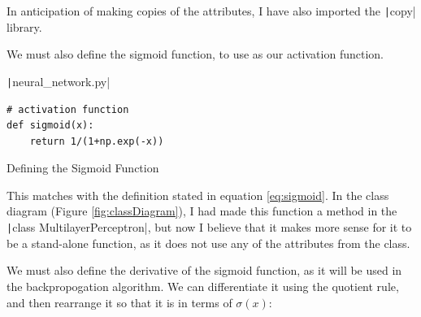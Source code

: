 \documentclass[12pt]{report}
\newcommand{\pil}[1]{\protect\texttt|#1|}
\begin{document}
In anticipation of making copies of the attributes, I have also imported the \pil{copy} library.

\begin{center}
\end{center}

We must also define the sigmoid function, to use as our activation function.

\begin{listing}[H]
\pil{neural_network.py}
\begin{verbatim}
# activation function
def sigmoid(x):
    return 1/(1+np.exp(-x))
\end{verbatim}
\caption{Defining the Sigmoid Function}\label{cs:sigmoidFunction}
\end{listing}

This matches with the definition stated in equation \ref{eq:sigmoid}. In the class diagram (Figure \ref{fig:classDiagram}), I had made this function a method in the \pil{class MultilayerPerceptron}, but now I believe that it makes more sense for it to be a stand-alone function, as it does not use any of the attributes from the class.

We must also define the derivative of the sigmoid function, as it will be used in the backpropogation algorithm. We can differentiate it using the quotient rule, and then rearrange it so that it is in terms of $\sigma\left(x\right)$:
\end{document}
